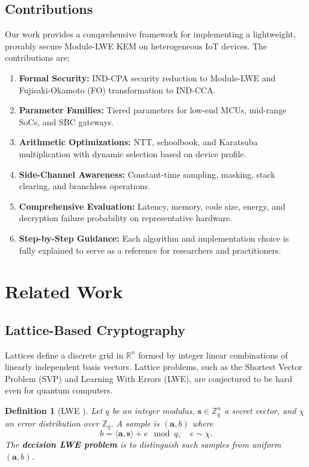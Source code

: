 \documentclass[conference]{IEEEtran}
\newtheorem{definition}{Definition}
\begin{document}
\subsection{Contributions}
Our work provides a comprehensive framework for implementing a lightweight, provably secure Module-LWE KEM on heterogeneous IoT devices. The contributions are:
\begin{enumerate}[label=\textbf{C\arabic*}]
    \item \textbf{Formal Security:} IND-CPA security reduction to Module-LWE and Fujisaki-Okamoto (FO) transformation to IND-CCA.
    \item \textbf{Parameter Families:} Tiered parameters for low-end MCUs, mid-range SoCs, and SBC gateways.
    \item \textbf{Arithmetic Optimizations:} NTT, schoolbook, and Karatsuba multiplication with dynamic selection based on device profile.
    \item \textbf{Side-Channel Awareness:} Constant-time sampling, masking, stack clearing, and branchless operations.
    \item \textbf{Comprehensive Evaluation:} Latency, memory, code size, energy, and decryption failure probability on representative hardware.
    \item \textbf{Step-by-Step Guidance:} Each algorithm and implementation choice is fully explained to serve as a reference for researchers and practitioners.
\end{enumerate}

\section{Related Work}
\subsection{Lattice-Based Cryptography}
Lattices define a discrete grid in $\mathbb{R}^n$ formed by integer linear combinations of linearly independent basis vectors. Lattice problems, such as the Shortest Vector Problem (SVP) and Learning With Errors (LWE), are conjectured to be hard even for quantum computers.

\begin{definition}[LWE \cite{Regev05}]
Let $q$ be an integer modulus, $\mathbf{s}\in \mathbb{Z}_q^n$ a secret vector, and $\chi$ an error distribution over $\mathbb{Z}_q$. A sample is $(\mathbf{a},b)$ where
\[
b = \langle \mathbf{a}, \mathbf{s}\rangle + e \mod q, \quad e \sim \chi.
\]
The \textbf{decision LWE problem} is to distinguish such samples from uniform $(\mathbf{a},b)$.
\end{definition}
\end{document}
